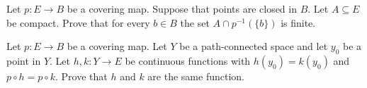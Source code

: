 \begin{problem}
  Let $p\colon E\to B$ be a covering map. Suppose that points are closed in
  $B$. Let $A\subseteq E$ be compact. Prove that for every $b\in B$ the set
  $A\cap p^{-1}(\{b\})$ is finite.
\end{problem}
\begin{solution}
\end{solution}

\begin{problem}
  Let $p\colon E\to B$ be a covering map. Let $Y$ be a path-connected space
  and let $y_0$ be a point in $Y$. Let $h,k\colon Y\to E$ be continuous
  functions with $h(y_0)=k(y_0)$ and $p\circ h=p\circ k$. Prove that $h$
  and $k$ are the same function.
\end{problem}
\begin{solution}
\end{solution}

